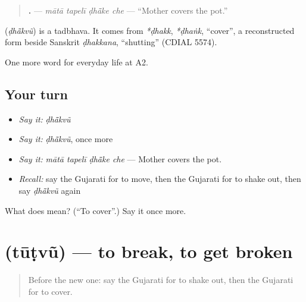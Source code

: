 \begin{quote}
\textbf{   .} — \emph{mātā tapelī ḍhā̃ke che} — \textquotedblleft{}Mother covers the pot.\textquotedblright{}
\end{quote}

\begin{cousinweb}
\textbf{} (\emph{ḍhā̃kvũ}) is a tadbhava. It comes from \emph{*ḍhakk}, \emph{*ḍhaṅk}, \textquotedblleft{}cover\textquotedblright{}, a reconstructed form beside Sanskrit \emph{ḍhakkana}, \textquotedblleft{}shutting\textquotedblright{} (CDIAL 5574).
\end{cousinweb}

\begin{grammarlens}[title={What you've built}]
One more word for everyday life at A2.
\end{grammarlens}

\subsection*{Your turn}
\begin{itemize}
\raggedright
  \item \emph{Say it:} \emph{ḍhā̃kvũ}
  \item \emph{Say it:} \emph{ḍhā̃kvũ}, once more
  \item \emph{Say it:} \emph{mātā tapelī ḍhā̃ke che} — Mother covers the pot.
  \item \emph{Recall:} say the Gujarati for to move, then the Gujarati for to shake out, then say \emph{ḍhā̃kvũ} again
\end{itemize}

\begin{tcolorbox}[breakable,colback=teal!4,colframe=teal!35!black,title={Before you move on}]
What does  mean? (\textquotedblleft{}To cover\textquotedblright{}.) Say it once more.
\end{tcolorbox}
\section[\texorpdfstring{\gu{તૂટવું} (tūṭvũ)}{તૂટવું (tūṭvũ)}]{ (tūṭvũ) — to break, to get broken}

\label{lesson:GU-C161-tutvu}



\begin{quote}
Before the new one: say the Gujarati for to shake out, then the Gujarati for to cover.
\end{quote}

